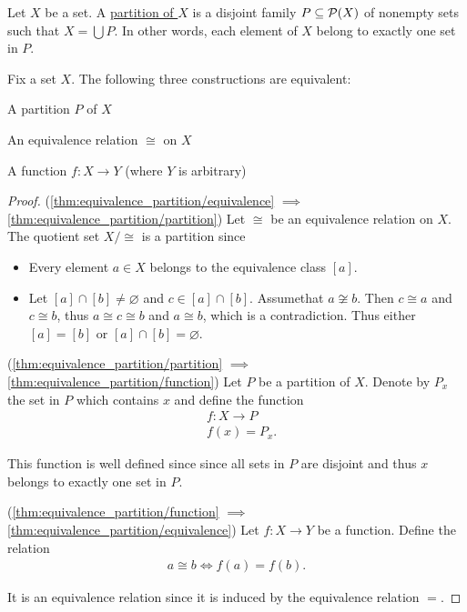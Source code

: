\begin{definition}\label{def:set_partition}
  Let $X$ be a set. A \ul{partition of $X$} is a disjoint family $P \subseteq \operatorname{\mathcal P}(X)$ of nonempty sets such that $X = \bigcup P$. In other words, each element of $X$ belong to exactly one set in $P$.
\end{definition}

\begin{proposition}\label{thm:equivalence_partition}
  Fix a set $X$. The following three constructions are equivalent:
  \begin{defenum}
    \item\label{thm:equivalence_partition/partition} A partition $P$ of $X$
    \item\label{thm:equivalence_partition/equivalence} An equivalence relation $\cong$ on $X$
    \item\label{thm:equivalence_partition/function} A function $f: X \to Y$ (where $Y$ is arbitrary)
  \end{defenum}
\end{proposition}
\begin{proof}
  (\ref{thm:equivalence_partition/equivalence} $\implies$ \ref{thm:equivalence_partition/partition}) Let $\cong$ be an equivalence relation on $X$. The quotient set $X / \cong$ is a partition since
  \begin{itemize}
    \item Every element $a \in X$ belongs to the equivalence class $[a]$.
    \item Let $[a] \cap [b] \neq \varnothing$ and $c \in [a] \cap [b]$. Assume\LEM that $a \not\cong b$. Then $c \cong a$ and $c \cong b$, thus $a \cong c \cong b$ and $a \cong b$, which is a contradiction. Thus either $[a] = [b]$ or $[a] \cap [b] = \varnothing$.
  \end{itemize}

  (\ref{thm:equivalence_partition/partition} $\implies$ \ref{thm:equivalence_partition/function}) Let $P$ be a partition of $X$. Denote by $P_x$ the set in $P$ which contains $x$ and define the function
  \begin{align*}
    &f: X \to P \\
    &f(x) = P_x.
  \end{align*}

  This function is well defined since since all sets in $P$ are disjoint and thus $x$ belongs to exactly one set in $P$.

  (\ref{thm:equivalence_partition/function} $\implies$ \ref{thm:equivalence_partition/equivalence}) Let $f: X \to Y$ be a function. Define the relation
  \begin{align*}
    a \cong b \iff f(a) = f(b).
  \end{align*}

  It is an equivalence relation since it is induced by the equivalence relation $=$.
\end{proof}

